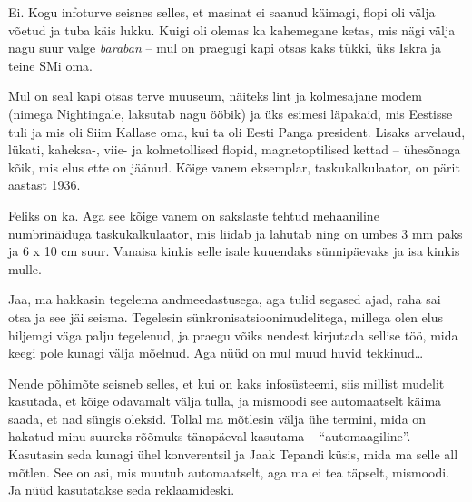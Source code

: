 
Ei. Kogu infoturve seisnes selles, et masinat ei saanud käimagi, flopi oli välja 
võetud ja tuba käis lukku. Kuigi oli olemas ka kahemegane ketas, mis nägi välja nagu
suur valge \emph{baraban} -- mul on praegugi kapi otsas kaks tükki, üks 
Iskra ja teine SMi oma.

Mul on seal kapi otsas terve muuseum, näiteks lint ja kolmesajane 
modem (nimega Nightingale, laksutab nagu ööbik) ja üks 
esimesi läpakaid, mis Eestisse tuli ja mis oli Siim Kallase oma, 
kui ta oli Eesti Panga president. Lisaks arvelaud, lükati, kaheksa-, viie- ja kolmetollised 
flopid, magnetoptilised kettad -- 
ühesõnaga kõik, mis elus ette on jäänud. Kõige vanem eksemplar, taskukalkulaator, on pärit 
aastast 1936.


Feliks on ka. Aga see kõige vanem on sakslaste tehtud mehaaniline numbrinäiduga taskukalkulaator, mis liidab ja 
lahutab ning on umbes 3 mm paks ja 6 x 10 cm suur. Vanaisa kinkis selle isale kuuendaks 
sünnipäevaks ja isa kinkis mulle. 


Jaa, ma hakkasin tegelema andmeedastusega, aga tulid segased ajad, raha sai 
otsa ja see jäi seisma. Tegelesin sünkronisatsioonimudelitega, millega olen 
elus hiljemgi väga palju tegelenud, ja praegu võiks nendest kirjutada sellise
töö, mida keegi pole kunagi välja mõelnud. Aga nüüd on mul muud huvid tekkinud\ldots 


Nende põhimõte seisneb selles, et kui on kaks infosüsteemi, siis millist mudelit 
kasutada, et kõige odavamalt välja tulla, ja mismoodi see automaatselt käima 
saada, et nad süngis oleksid. Tollal ma mõtlesin välja ühe termini, mida on hakatud minu suureks rõõmuks tänapäeval kasutama -- 
\enquote{automaagiline}. Kasutasin seda kunagi ühel konverentsil ja Jaak Tepandi küsis, mida ma selle all mõtlen. See on asi, mis muutub automaatselt, aga ma ei 
tea täpselt, mismoodi. Ja nüüd kasutatakse seda reklaamideski. 

